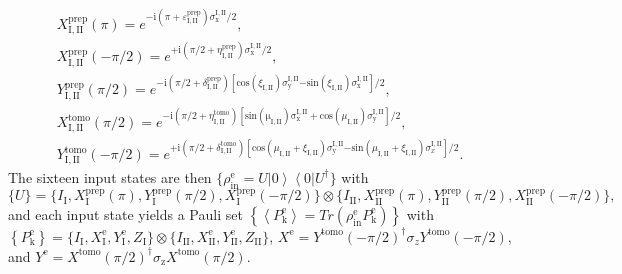 \[
\begin{array}{c}
X_{\mathrm{I,II}}^{\mathrm{prep}}(\pi)=e^{-\mathrm{i}\left(\pi+\varepsilon_{\mathrm{I,II}}^{\mathrm{prep}}\right)\sigma_{\mathrm{x}}^{\mathrm{I,II}}/2},\\
X_{\mathrm{I,II}}^{\mathrm{prep}}(-\pi/2)=e^{+\mathrm{i}\left(\pi/2+\eta_{\mathrm{I,II}}^{\mathrm{prep}}\right)\sigma_{\mathrm{x}}^{\mathrm{I,II}}/2},\\
Y_{\mathrm{I,II}}^{\mathrm{prep}}(\pi/2)=e^{-\mathrm{i}\left(\pi/2+\delta_{\mathrm{I,II}}^{\mathrm{prep}}\right)\left[\mathrm{cos}\left(\xi_{\mathrm{I,II}}\right)\sigma_{\mathrm{y}}^{\mathrm{I,II}}\mathrm{-sin}\left(\xi_{\mathrm{I,II}}\right)\sigma_{\mathrm{x}}^{\mathrm{I,II}}\right]/2},\\
X_{\mathrm{I,II}}^{\mathrm{tomo}}(\pi/2)=e^{-\mathrm{i}\left(\pi/2+\eta_{\mathrm{I,II}}^{\mathrm{tomo}}\right)\left[\mathrm{\mathrm{sin}\left(\mu_{I,II}\right)\sigma_{x}^{I,II}+cos}\left(\mu_{\mathrm{I,II}}\right)\sigma_{\mathrm{y}}^{\mathrm{I,II}}\right]/2},\\
Y_{\mathrm{I,II}}^{\mathrm{tomo}}(-\pi/2)=e^{+\mathrm{i}\left(\pi/2+\delta_{\mathrm{I,II}}^{\mathrm{tomo}}\right)\left[\mathrm{cos}\left(\mu_{\mathrm{I,II}}+\xi_{\mathrm{I,II}}\right)\sigma_{\mathrm{y}}^{\mathrm{I,II}}\mathrm{-sin}\left(\mu_{\mathrm{I,II}}+\xi_{\mathrm{I,II}}\right)\sigma_{x}^{\mathrm{I,II}}\right]/2}.\end{array}\]
The sixteen input states are then $\{ \rho_{\mathrm{in}}^{\mathrm{e}}=U\left|0\right\rangle \left\langle 0\right|U^{\dagger}\} $
with 
%
\begin{equation}
\{ U\} =\{I_{\mathrm{I}}, X_{\mathrm{I}}^{\mathrm{prep}}(\pi), Y_{\mathrm{I}}^{\mathrm{prep}}(\pi/2),X_{\mathrm{I}}^{\mathrm{prep}}(-\pi/2)\}\otimes\{I_{\mathrm{II}},X_{\mathrm{II}}^{\mathrm{prep}}(\pi),Y_{\mathrm{II}}^{\mathrm{prep}}(\pi/2),X_{\mathrm{II}}^{\mathrm{prep}}(-\pi/2)\},
\end{equation}
%
and each input state yields a Pauli set $\left\{ \left\langle P_{\mathrm{k}}^{\mathrm{e}}\right\rangle =Tr\left(\rho_{\mathrm{in}}^{\mathrm{e}}P_{\mathrm{k}}^{\mathrm{e}}\right)\right\} $
with $\left\{ P_{\mathrm{k}}^{\mathrm{e}}\right\} =\{I_{\mathrm{I}},X_{\mathrm{I}}^{\mathrm{e}},Y_{\mathrm{I}}^{\mathrm{e}},Z_{\mathrm{I}}\}\otimes\{I_{\mathrm{II}},X_{\mathrm{II}}^{\mathrm{e}},Y_{\mathrm{II}}^{\mathrm{e}},Z_{\mathrm{II}}\}$,
$X^{\mathrm{e}}=Y^{\mathrm{tomo}}(-\pi/2)^{\dagger}\sigma_{z}Y^{\mathrm{tomo}}(-\pi/2)$,
and $Y^{\mathrm{e}}=X^{\mathrm{tomo}}(\pi/2)^{\dagger}\sigma_{\mathrm{z}}X^{\mathrm{tomo}}(\pi/2)$.
